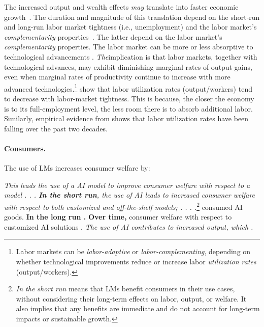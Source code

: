 {{{{{The increased output and wealth effects \emph{may} translate into faster economic growth~\citep{agostinelli2020productivity, restrepo2023automation}.
The duration and magnitude of this translation depend on the short-run and long-run labor market tightness (i.e., unemployment) and the labor market's \emph{complementarity} properties~\citep{agostinelli2020productivity, restrepo2023automation}.
The latter depend on the labor market's \emph{complementarity} properties.
The labor market can be more or less absorptive to technological advancements . \emph{The}implication is that labor markets, together with technological advances, may exhibit diminishing marginal rates of output gains, even when marginal rates of productivity continue to increase with more advanced technologies.}\footnote{Labor markets can be \emph{labor-adaptive} or \emph{labor-complementing}, depending on whether technological improvements reduce or increase labor \emph{utilization rates} (output/workers).}
\citet{agostinelli2020productivity} show that labor utilization rates (output/workers) tend to decrease with labor-market tightness.
This is because, the closer the economy is to its full-employment level, the less room there is to absorb additional labor.
Similarly, empirical evidence from \citet{restrepo2023automation} shows that labor utilization rates have been falling over the past two decades.

\paragraph{Consumers.}
The use of LMs increases consumer welfare by:
\begin{myquotation}
    \emph{This leads the use of a \capname AI model to improve consumer welfare with respect to a \capname model . . . \textbf{In the short run}, the use of AI leads to increased consumer welfare with respect to both customized and off-the-shelf \capname models; . . . .}\footnote{\emph{In the short run} means that LMs benefit consumers in their use cases, without considering their long-term effects on labor, output, or welfare. It also implies that any benefits are immediate and do not account for long-term impacts or sustainable growth.} consumed AI goods. \textbf{In the long run .} \textbf{Over time,} consumer welfare with respect to customized AI solutions . \emph{The use of AI contributes to increased output, which .}
\end{myquotation}

}}}}
